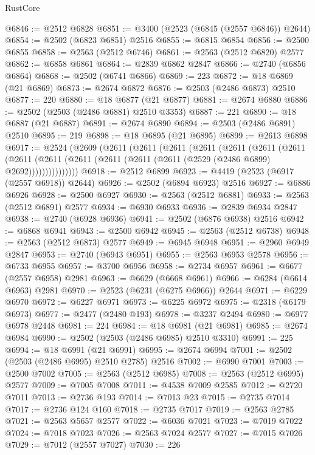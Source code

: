 \begin{lexlean}{RustCore}
\begin{coremodule}
@6846 := @2512 @6828
@6851 := @3400 (@2523 (@6845 (@2557 @6846)) @2644)
@6854 := @2502 (@6823 @6851) @2516
@6855 := @6815 @6854
@6856 := @2500 @6855
@6858 := @2563 (@2512 @6746)
@6861 := @2563 (@2512 @6820) @2577
@6862 := @6858 @6861
@6864 := @2839 @6862 @2847
@6866 := @2740 (@6856 @6864)
@6868 := @2502 (@6741 @6866)
@6869 := 223
@6872 := @18 @6869 (@21 @6869)
@6873 := @2674 @6872
@6876 := @2503 (@2486 @6873) @2510
@6877 := 220
@6880 := @18 @6877 (@21 @6877)
@6881 := @2674 @6880
@6886 := @2502 (@2503 (@2486 @6881) @2510 @3353)
@6887 := 221
@6890 := @18 @6887 (@21 @6887)
@6891 := @2674 @6890
@6894 := @2503 (@2486 @6891) @2510
@6895 := 219
@6898 := @18 @6895 (@21 @6895)
@6899 := @2613 @6898
@6917 := @2524
    (@2609
      (@2611
        (@2611
          (@2611
            (@2611
              (@2611
                (@2611
                  (@2611
                    (@2611
                      (@2611 (@2611 (@2611 (@2611 (@2611 (@2529 (@2486 @6899) @2692)))))))))))))))
@6918 := @2512 @6899
@6923 := @4419 (@2523 (@6917 (@2557 @6918)) @2644)
@6926 := @2502 (@6894 @6923) @2516
@6927 := @6886 @6926
@6928 := @2500 @6927
@6930 := @2563 (@2512 @6881)
@6933 := @2563 (@2512 @6891) @2577
@6934 := @6930 @6933
@6936 := @2839 @6934 @2847
@6938 := @2740 (@6928 @6936)
@6941 := @2502 (@6876 @6938) @2516
@6942 := @6868 @6941
@6943 := @2500 @6942
@6945 := @2563 (@2512 @6738)
@6948 := @2563 (@2512 @6873) @2577
@6949 := @6945 @6948
@6951 := @2960 @6949 @2847
@6953 := @2740 (@6943 @6951)
@6955 := @2563 @6953 @2578
@6956 := @6733 @6955
@6957 := @3700 @6956
@6958 := @2734 @6957
@6961 := @6677 (@2557 @6958) @2981
@6963 := @6629 (@6668 @6961)
@6966 := @6284 (@6614 @6963) @2981
@6970 := @2523 (@6231 (@6275 @6966)) @2644
@6971 := @6229 @6970
@6972 := @6227 @6971
@6973 := @6225 @6972
@6975 := @2318 (@6179 @6973)
@6977 := @2477 (@2480 @193)
@6978 := @3237 @2494
@6980 := @6977 @6978 @2448
@6981 := 224
@6984 := @18 @6981 (@21 @6981)
@6985 := @2674 @6984
@6990 := @2502 (@2503 (@2486 @6985) @2510 @3310)
@6991 := 225
@6994 := @18 @6991 (@21 @6991)
@6995 := @2674 @6994
@7001 := @2502 (@2503 (@2486 @6995) @2510 @2785) @2516
@7002 := @6990 @7001
@7003 := @2500 @7002
@7005 := @2563 (@2512 @6985)
@7008 := @2563 (@2512 @6995) @2577
@7009 := @7005 @7008
@7011 := @4538 @7009 @2585
@7012 := @2720 @7011
@7013 := @2736 @193
@7014 := @7013 @23
@7015 := @2735 @7014
@7017 := @2736 @124 @160
@7018 := @2735 @7017
@7019 := @2563 @2785
@7021 := @2563 @5657 @2577
@7022 := @6036 @7021
@7023 := @7019 @7022
@7024 := @7018 @7023
@7026 := @2563 @7024 @2577
@7027 := @7015 @7026
@7029 := @7012 (@2557 @7027)
@7030 := 226

\end{coremodule}
\end{lexlean}
